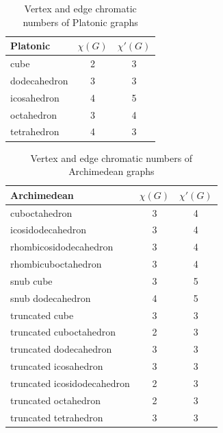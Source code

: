\begin{table}[H]
    \centering
    \caption{Vertex and edge chromatic numbers of Platonic graphs}
    \vspace{5pt}
    \label{tab:platonic-chrom-nums}
    \begin{tabular}{|l|c|c|}
    \hline
    Platonic & $\chi(G)$ & $\chi'(G)$ \\
    \hline\hline
    cube & 2 & 3 \\
    \hline
    dodecahedron & 3 & 3 \\
    \hline
    icosahedron & 4 & 5 \\
    \hline
    octahedron & 3 & 4 \\
    \hline
    tetrahedron & 4 & 3 \\
    \hline
    \end{tabular}
\end{table}

\begin{table}[H]
    \centering
    \caption{Vertex and edge chromatic numbers of Archimedean graphs}
    \vspace{5pt}
    \label{tab:archimedean-chrom-nums}
    \begin{tabular}{|l|c|c|}
    \hline
    Archimedean & $\chi(G)$ & $\chi'(G)$ \\
    \hline\hline
    cuboctahedron & 3 & 4 \\
    \hline
    icosidodecahedron & 3 & 4 \\
    \hline
    rhombicosidodecahedron & 3 & 4 \\
    \hline
    rhombicuboctahedron & 3 & 4 \\
    \hline
    snub cube & 3 & 5 \\
    \hline
    snub dodecahedron & 4 & 5 \\
    \hline
    truncated cube & 3 & 3 \\
    \hline
    truncated cuboctahedron & 2 & 3 \\
    \hline
    truncated dodecahedron & 3 & 3 \\
    \hline
    truncated icosahedron & 3 & 3 \\
    \hline
    truncated icosidodecahedron & 2 & 3 \\
    \hline
    truncated octahedron & 2 & 3 \\
    \hline
    truncated tetrahedron & 3 & 3 \\
    \hline
    \end{tabular}
\end{table}

